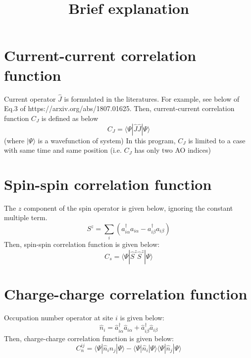 \documentclass{article}
\begin{document}
\title{Brief explanation}
\maketitle


\section{Current-current correlation function}
Current operator $\hat{J}$ is formulated in the literatures. For example, see below of Eq.3 of https://arxiv.org/abs/1807.01625.
Then, current-current correlation function $C_{J}$ is defined as below
\begin{equation}
C_{J} = \langle \Psi | \hat{J}\hat{J} | \Psi \rangle
\end{equation}
(where $|\Psi\rangle$ is a wavefunction of system)
In this program, $C_{J}$ is limited to a case with same time and same position (i.e. $C_{J}$ has only two AO indices)

\section{Spin-spin correlation function}
The $z$ component of the spin operator is given below, ignoring the constant multiple term.
\begin{equation}
    S^{z} = \sum_{i} (a^{\dagger}_{i\alpha}a_{i\alpha} - a^{\dagger}_{i\beta}a_{i\beta})
\end{equation}
Then, spin-spin correlation function is given below:
\begin{equation}
C_{s} = \langle \Psi | \hat{S}^{z}\hat{S}^{z} | \Psi \rangle
\end{equation}

\section{Charge-charge correlation function}
Occupation number operator at site $i$ is given below:
\begin{equation}
\hat{n}_{i} = \hat{a}^{\dagger}_{i\alpha}\hat{a}_{i\alpha} + \hat{a}^{\dagger}_{i\beta}\hat{a}_{i\beta}
\end{equation}
Then, charge-charge correlation function is given below:
\begin{equation}
C_{n}^{ij} = \langle \Psi | \hat{n}_{i}\hat{n}_{j} | \Psi \rangle
- \langle \Psi | \hat{n}_{i} | \Psi \rangle
\langle \Psi | \hat{n}_{j} | \Psi \rangle
\end{equation}
\end{document}

